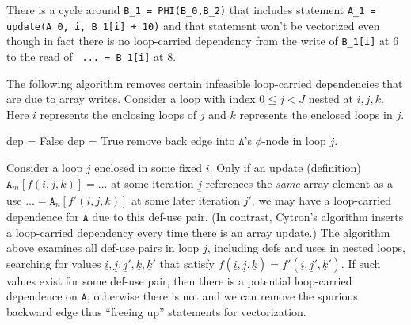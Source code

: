 There is a cycle around \texttt{B\_1 = PHI(B\_0,B\_2)} that includes statement
\texttt{A\_1 = update(A\_0, i, B\_1[i] + 10)} and that statement won't be vectorized even
though in fact there is no loop-carried dependency from the write of \texttt{B\_1[i]} at 6 to the
read of \texttt{ ... = B\_1[i]} at 8.

The following algorithm removes certain infeasible loop-carried dependencies that are due to array writes. Consider a loop with index $0 \le j < J$
nested at $i,j,k$. Here $i$ represents the enclosing loops of $j$ and $k$ represents the enclosed loops in $j$.

\begin{algorithmic}
\STATE {}
\STATE dep = False
\STATE dep = True
\ENDIF
\ENDFOR
{}
\STATE remove back edge into $\texttt{A}$'s $\phi$-node in loop $j$.
\ENDIF
\ENDFOR
\end{algorithmic}

Consider a loop $j$ enclosed in some fixed $\underline{i}$. Only if an update (definition) $\texttt{A}_m[f(i,j,k)] = ... $ at some iteration $\underline{j}$
references the \emph{same} array element as a use $ ... = \texttt{A}_n[f'(i,j,k)]$ at some later iteration $\underline{j}'$,
we may have a loop-carried dependence for $\texttt{A}$ due to this def-use pair. (In contrast, Cytron's algorithm inserts a loop-carried dependency every time there is an array update.)
The algorithm above examines all def-use pairs in loop $j$, including defs and uses in nested loops, searching for values $\underline{i}, \underline{j}, \underline{j}', \underline{k}, \underline{k}'$ that satisfy
$f(\underline{i},\underline{j},\underline{k}) = f'(\underline{i},\underline{j}',\underline{k}')$. If such values exist for some def-use pair, then there is a potential
loop-carried dependence on $\texttt{A}$; otherwise there is not and we can remove the spurious backward edge thus ``freeing up'' statements for vectorization. %

